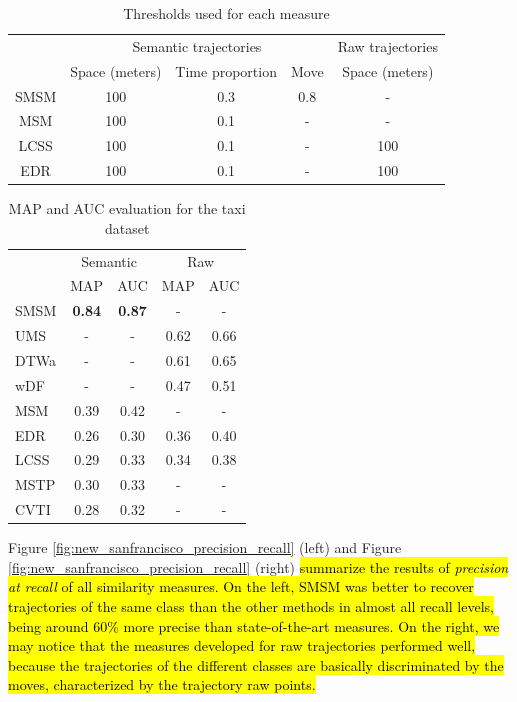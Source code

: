 \documentclass[12pt]{article}
\begin{document}
\begin{table}[!h]
\scriptsize
  \centering
  \begin{tabular}{|c|c|c|c|c|}
  	\hline
  & \multicolumn{3}{c|}{Semantic trajectories} & \multicolumn{1}{c|}{Raw trajectories} \\
 	\cline{2-5}
  & Space (meters) & Time proportion & Move & Space (meters) \\
  	\hline
 SMSM & 100 & 0.3 & 0.8 & - \\
 MSM & 100 & 0.1 & - & - \\
 LCSS & 100 & 0.1 & - & 100 \\
 EDR & 100 & 0.1 & - & 100 \\
    \hline
  \end{tabular}
  \caption{Thresholds used for each measure}
  \label{tab:new_san_francisco_thresholds}
\end{table}


\begin{table}[h]
\scriptsize
  \centering
  \begin{tabular}{|l|c|c|c|c|}
  	\hline
 & \multicolumn{2}{c}{Semantic} & \multicolumn{2}{|c|}{Raw} \\
 	\cline{2-5}
 & MAP & AUC & MAP & AUC \\
  	\hline
SMSM & \textbf{0.84} & \textbf{0.87} & - & -\\
UMS & - & - & 0.62 & 0.66 \\
DTWa & - & - & 0.61 & 0.65 \\
wDF & - & - & 0.47 & 0.51 \\
MSM & 0.39 & 0.42 & - & - \\
EDR & 0.26 & 0.30 & 0.36 & 0.40 \\
LCSS & 0.29 & 0.33 & 0.34 & 0.38 \\
MSTP & 0.30 & 0.33 & - & - \\
CVTI & 0.28 & 0.32 & - & - \\
    \hline
  \end{tabular}
  \caption{MAP and AUC evaluation for the taxi dataset}
  \label{tab:new_sanfrancisco_measures_map_auc}
\end{table}


Figure \ref{fig:new_sanfrancisco_precision_recall} (left) and Figure \ref{fig:new_sanfrancisco_precision_recall} (right) \hl{summarize the results of \emph{precision at recall}  of all similarity measures. On the left, SMSM was better to recover trajectories of the same class than the other methods in almost all recall levels, being around  60\% more precise than  state-of-the-art measures. On the right, we may notice that the measures developed for raw trajectories performed well, because the trajectories of the different classes are basically discriminated by the moves, characterized by the trajectory raw points.}
\end{document}
